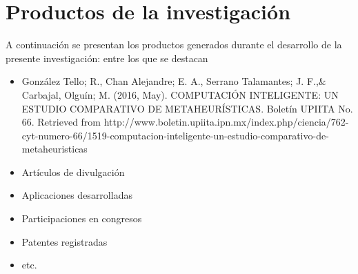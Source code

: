 \section{Productos de la investigaci\'{o}n}
A continuaci\'{o}n  se presentan los productos generados durante el desarrollo de la presente investigaci\'{o}n: entre los que se destacan
\begin{itemize}
\item Gonz\'alez Tello; R., Chan Alejandre; E. A., Serrano Talamantes; J. F.,\& Carbajal, Olgu\'in; M. (2016, May). COMPUTACI\'ON INTELIGENTE: UN ESTUDIO COMPARATIVO DE METAHEUR\'ISTICAS. Bolet\'in UPIITA No. 66. Retrieved from http://www.boletin.upiita.ipn.mx/index.php/ciencia/762-cyt-numero-66/1519-computacion-inteligente-un-estudio-comparativo-de-metaheuristicas
\item Art\'{i}culos de divulgaci\'{o}n
\item Aplicaciones desarrolladas
\item Participaciones en congresos
\item Patentes registradas
\item etc.
\end{itemize}
